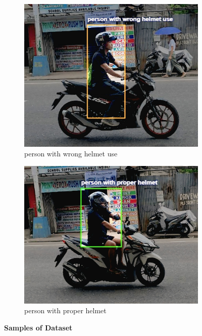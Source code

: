 \begin{refsection}
\begin{figure}[H]
    \centering
    \begin{subfigure}{0.45\textwidth}
        \centering
        \includegraphics[width=\linewidth]{figures/Fig 4c.jpg}
        \caption{person with wrong helmet use}
        \label{fig:4c}
    \end{subfigure}
    \hfill
    \begin{subfigure}{0.45\textwidth}
        \centering
        \includegraphics[width=\linewidth]{figures/Fig 4d.jpg}
        \caption{person with proper helmet}
        \label{fig:4d}
    \end{subfigure}
    \caption{\textbf{Samples of Dataset}}
    \label{fig:dataset_row2}
\end{figure}


\end{refsection}
